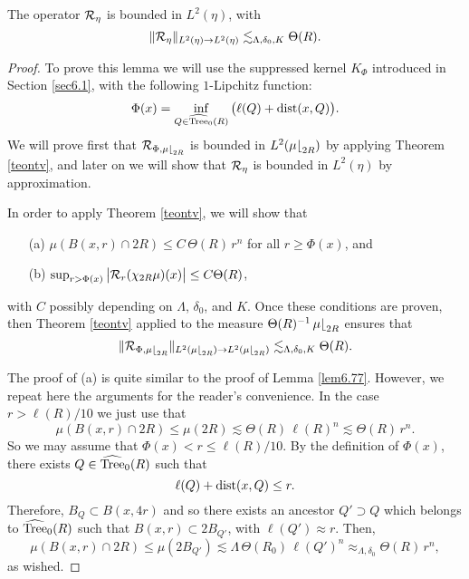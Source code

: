 \vv

\begin{lemma}\label{lemriesz*eta}
The operator ${\mathcal R}_\eta$ is bounded in $L^2(\eta)$, with
$$\|{\mathcal R}_\eta\|_{L^2(\eta)\to L^2(\eta)}\lesssim_{\Lambda,\delta_0,K}\Theta(R).$$
\end{lemma}

\begin{proof}
To prove this lemma we will use the suppressed kernel $K_\Phi$ introduced in Section \ref{sec6.1},
with the following $1$-Lipchitz function:
$$\Phi(x) =\inf_{Q\in{\widehat{{\rm Tree}}}_0(R)} \big(\ell(Q) + {\rm dist}(x,Q)\big).$$
We will prove first that ${\mathcal R}_{\Phi,\mu{\lfloor}_{2R}}$ is bounded in $L^2(\mu{\lfloor}_{2R})$ by applying Theorem
\ref{teontv}, and later on we will 
show that ${\mathcal R}_\eta$ is bounded in $L^2(\eta)$ by approximation. 

In order to apply Theorem \ref{teontv}, we will show that
\begin{itemize}
\item[(a)] $\mu(B(x,r)\cap 2R)\leq C\,\Theta(R)\,r^n$ for all $r\geq \Phi(x)$, and
\item[(b)] $\sup_{r>\Phi(x)}\big|{\mathcal R}_r(\chi_{2R}\mu)(x)\big|\leq C\Theta(R)$,
\end{itemize}
with $C$ possibly depending on $\Lambda$, $\delta_0$, and $K$. Once these conditions are proven, then Theorem \ref{teontv} applied to the measure $\Theta(R)^{-1}\,\mu{\lfloor}_{2R}$ ensures that 
\begin{equation}\label{eqphi894}
\|{\mathcal R}_{\Phi,\mu{\lfloor}_{2R}}\|_{L^2(\mu{\lfloor}_{2R})\to L^2(\mu{\lfloor}_{2R})}\lesssim_{\Lambda,\delta_0,K}\Theta(R).
\end{equation}

The proof of (a) is quite similar to the proof of Lemma \ref{lem6.77}. However, we repeat
here the arguments for the reader's convenience.
In the case $r>\ell(R)/10$ we just use that
$$\mu(B(x,r)\cap 2R)\leq \mu(2R)\lesssim \Theta(R)\,\ell(R)^n\lesssim \Theta(R)\,r^n.$$
So we may assume that $\Phi(x)<r\leq \ell(R)/10$.
By the definition of $\Phi(x)$, there exists $Q\in{\widehat{{\rm Tree}}}_0(R)$ such that
$$\ell(Q) + {\rm dist}(x,Q)\leq r.$$
Therefore, $B_Q\subset B(x,4r)$ and so there exists an ancestor $Q'\supset Q$ which belongs to ${\widehat{{\rm Tree}}}_0(R)$ such that $B(x,r)\subset  2B_{Q'}$, with $\ell(Q')\approx r$.  
Then,
$$\mu(B(x,r)\cap 2R)\leq \mu(2B_{Q'}) \lesssim \Lambda\,\Theta(R_0)\,\ell(Q')^n\approx_{\Lambda,\delta_0} \Theta(R)\,r^n,$$
as wished.


\end{proof}
